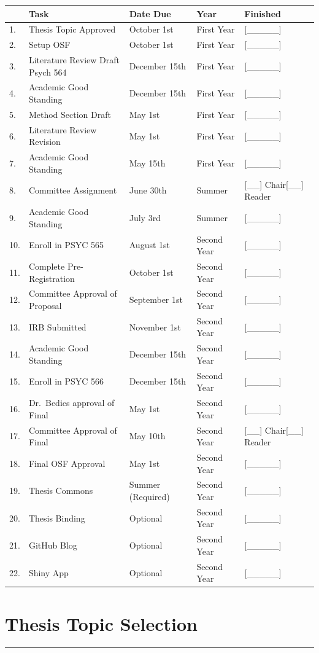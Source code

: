 \documentclass[
  openany]{book}
\begin{document}
\begin{longtable}[]{@{}lllll@{}}
\toprule
& Task & Date Due & Year & Finished\tabularnewline
\midrule
\endhead
1. & Thesis Topic Approved & October 1st & First Year & {[}\_\_\_\_\_{]}\tabularnewline
2. & Setup OSF & October 1st & First Year & {[}\_\_\_\_\_{]}\tabularnewline
3. & Literature Review Draft Psych 564 & December 15th & First Year & {[}\_\_\_\_\_{]}\tabularnewline
4. & Academic Good Standing & December 15th & First Year & {[}\_\_\_\_\_{]}\tabularnewline
5. & Method Section Draft & May 1st & First Year & {[}\_\_\_\_\_{]}\tabularnewline
6. & Literature Review Revision & May 1st & First Year & {[}\_\_\_\_\_{]}\tabularnewline
7. & Academic Good Standing & May 15th & First Year & {[}\_\_\_\_\_{]}\tabularnewline
8. & Committee Assignment & June 30th & Summer & {[}\_\_{]} Chair{[}\_\_{]} Reader\tabularnewline
9. & Academic Good Standing & July 3rd & Summer & {[}\_\_\_\_\_{]}\tabularnewline
10. & Enroll in PSYC 565 & August 1st & Second Year & {[}\_\_\_\_\_{]}\tabularnewline
11. & Complete Pre-Registration & October 1st & Second Year & {[}\_\_\_\_\_{]}\tabularnewline
12. & Committee Approval of Proposal & September 1st & Second Year & {[}\_\_\_\_\_{]}\tabularnewline
13. & IRB Submitted & November 1st & Second Year & {[}\_\_\_\_\_{]}\tabularnewline
14. & Academic Good Standing & December 15th & Second Year & {[}\_\_\_\_\_{]}\tabularnewline
15. & Enroll in PSYC 566 & December 15th & Second Year & {[}\_\_\_\_\_{]}\tabularnewline
16. & Dr.~Bedics approval of Final & May 1st & Second Year & {[}\_\_\_\_\_{]}\tabularnewline
17. & Committee Approval of Final & May 10th & Second Year & {[}\_\_{]} Chair{[}\_\_{]} Reader\tabularnewline
18. & Final OSF Approval & May 1st & Second Year & {[}\_\_\_\_\_{]}\tabularnewline
19. & Thesis Commons & Summer (Required) & Second Year & {[}\_\_\_\_\_{]}\tabularnewline
20. & Thesis Binding & Optional & Second Year & {[}\_\_\_\_\_{]}\tabularnewline
21. & GitHub Blog & Optional & Second Year & {[}\_\_\_\_\_{]}\tabularnewline
22. & Shiny App & Optional & Second Year & {[}\_\_\_\_\_{]}\tabularnewline
\bottomrule
\end{longtable}

\hypertarget{thesis-topic-selection}{%
\section{Thesis Topic Selection}\label{thesis-topic-selection}}

\begin{center}\rule{0.5\linewidth}{0.5pt}\end{center}
\end{document}
